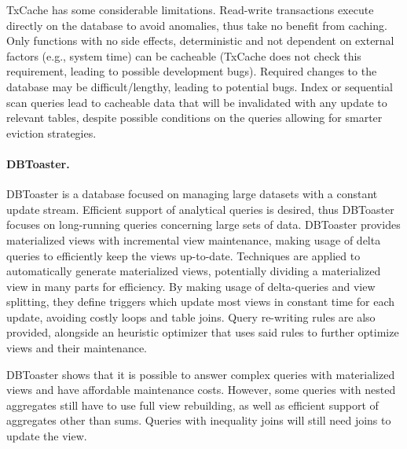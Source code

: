 TxCache has some considerable limitations.
Read-write transactions execute directly on the database to avoid anomalies, thus take no benefit from caching.
Only functions with no side effects, deterministic and not dependent on external factors (e.g., system time) can be cacheable (TxCache does not check this requirement, leading to possible development bugs).
Required changes to the database may be difficult/lengthy, leading to potential bugs.
Index or sequential scan queries lead to cacheable data that will be invalidated with any update to relevant tables, despite possible conditions on the queries allowing for smarter eviction strategies.

\paragraph{DBToaster.} DBToaster \cite{dbtoaster} is a database focused on managing large datasets with a constant update stream.
Efficient support of analytical queries is desired, thus DBToaster focuses on long-running queries concerning large sets of data.
DBToaster provides materialized views with incremental view maintenance, making usage of delta queries to efficiently keep the views up-to-date.
Techniques are applied to automatically generate materialized views, potentially dividing a materialized view in many parts for efficiency.
By making usage of delta-queries and view splitting, they define triggers which update most views in constant time for each update, avoiding costly loops and table joins.
Query re-writing rules are also provided, alongside an heuristic optimizer that uses said rules to further optimize views and their maintenance.

DBToaster shows that it is possible to answer complex queries with materialized views and have affordable maintenance costs.
However, some queries with nested aggregates still have to use full view rebuilding, as well as efficient support of aggregates other than sums.
Queries with inequality joins will still need joins to update the view.



